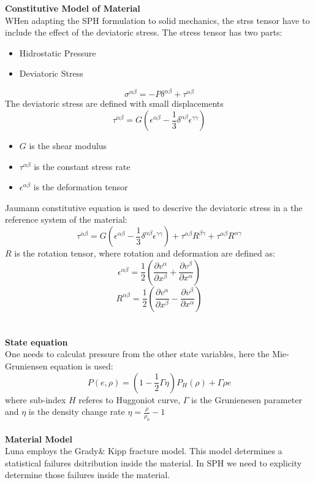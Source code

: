 \documentclass[12pt]{thesis}
\begin{document}
\textbf{Constitutive Model of Material}\\
WHen adapting the SPH formulation to solid mechanics, the strss tensor have to include the effect of the deviatoric stress. The stress tensor has two parts:
\begin{itemize}
\item Hidrostatic Pressure
\item Deviatoric Stress
\end{itemize}
\[\sigma^{\alpha\beta}=-P\delta^{\alpha\beta}+\tau^{\alpha\beta}\]
The deviatoric stress are defined with small displacements
\[\tau^{\dot{\alpha}\beta}=G\left(\epsilon^{\alpha\beta}-\frac{1}{3}\delta^{\alpha\beta}\epsilon^{\gamma\gamma}\right)\]
\begin{itemize}
\item $G$ is the shear modulus
\item $\tau^{\alpha\beta}$ is the constant stress rate
\item $\epsilon^{\alpha\beta}$ is the deformation tensor
\end{itemize}
Jaumann constitutive equation is used to descrive the deviatoric stress in a the reference system of the material:
\[\tau^{\dot{\alpha}\beta}=G\left(\epsilon^{\alpha\beta}-\frac{1}{3}\delta^{\alpha\beta}\epsilon^{\gamma\gamma}\right)+\tau^{\alpha\beta}R^{\beta\gamma}+\tau^{\alpha\beta}R^{\alpha\gamma}\]
$R$ is the rotation tensor, where rotation and deformation are defined as:
\[\epsilon^{\alpha\beta}=\frac{1}{2}\left(\frac{\partial v^\alpha}{\partial x^\beta}+\frac{\partial v^\beta}{\partial x^\alpha}\right)\]
\[R^{\alpha\beta}=\frac{1}{2}\left(\frac{\partial v^\alpha}{\partial x^\beta}-\frac{\partial v^\beta}{\partial x^\alpha}\right)\]
\\ \\
\textbf{State equation}\\
One needs to calculat pressure from the other state variables, here the Mie-Gruniensen equation is used:
\[P(e,\rho)=\left(1-\frac{1}{2}\Gamma\eta\right)P_H(\rho)+\Gamma\rho e\]
where sub-index $H$ referes to Huggoniot curve, $\Gamma$ is the Grunienesen parameter and $\eta$ is the density change rate $\eta=\frac{\rho}{\rho_0}-1$
\\ \\
\textbf{Material Model}\\ 
Luna employs the Grady\& Kipp fracture model. This model determines a statistical failures dsitribution inside the material. In SPH we need to explicity determine those failures inside the material.



\end{document}
